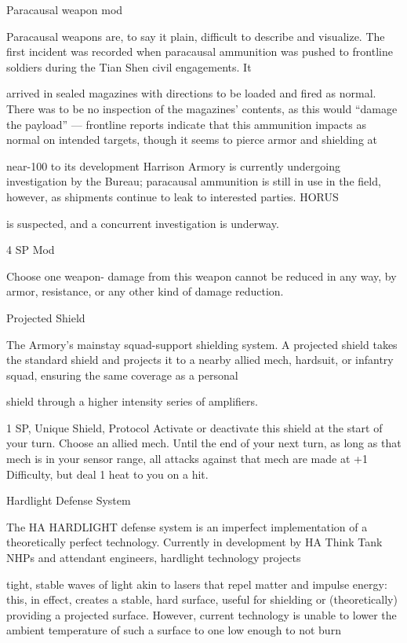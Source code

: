 Paracausal weapon mod

Paracausal weapons are, to say it plain, difficult to describe and visualize. The first incident was recorded
when paracausal ammunition was pushed to frontline soldiers during the Tian Shen civil engagements. It

arrived in sealed magazines with directions to be loaded and fired as normal. There was to be no inspection
of the magazines’ contents, as this would ``damage the payload'' — frontline reports indicate that this
ammunition impacts as normal on intended targets, though it seems to pierce armor and shielding at




near-100%
to its development Harrison Armory is currently undergoing investigation by the Bureau; paracausal
ammunition is still in use in the field, however, as shipments continue to leak to interested parties. HORUS

is suspected, and a concurrent investigation is underway.

4 SP
Mod

Choose one weapon- damage from this weapon cannot be reduced in any way, by armor,
resistance, or any other kind of damage reduction.


Projected Shield

The Armory’s mainstay squad-support shielding system. A projected shield takes the standard shield and
projects it to a nearby allied mech, hardsuit, or infantry squad, ensuring the same coverage as a personal

shield through a higher intensity series of amplifiers.

1 SP, Unique
Shield, Protocol
Activate or deactivate this shield at the start of your turn. Choose an allied mech. Until the end of
your next turn, as long as that mech is in your sensor range, all attacks against that mech are
made at +1 Difficulty, but deal 1 heat to you on a hit.


Hardlight Defense System

The HA HARDLIGHT defense system is an imperfect implementation of a theoretically perfect technology.
Currently in development by HA Think Tank NHPs and attendant engineers, hardlight technology projects

tight, stable waves of light akin to lasers that repel matter and impulse energy: this, in effect, creates a
stable, hard surface, useful for shielding or (theoretically) providing a projected surface. However, current
technology is unable to lower the ambient temperature of such a surface to one low enough to not burn

